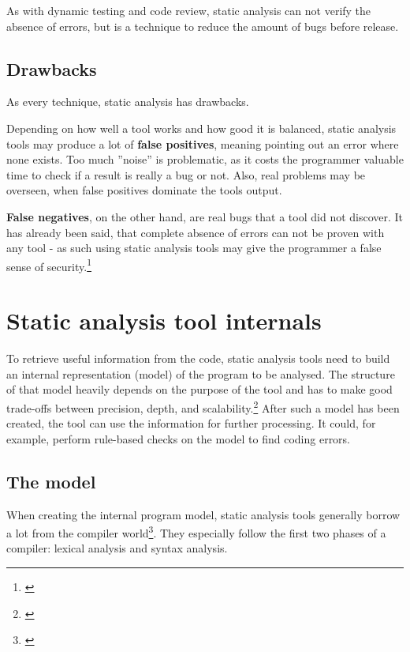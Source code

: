 As with dynamic testing and code review, static analysis can not verify the absence of errors, but is a technique to reduce the amount of bugs before release.

\subsection{Drawbacks}

As every technique, static analysis has drawbacks. 

Depending on how well a tool works and how good it is balanced, static analysis tools may produce a lot of \textbf{false positives}, meaning pointing out an error where none exists. Too much ''noise'' is problematic, as it costs the programmer valuable time to check if a result is really a bug or not. Also, real problems may be overseen, when false positives dominate the tools output.

\textbf{False negatives}, on the other hand, are real bugs that a tool did not discover. It has already been said, that complete absence of errors can not be proven with any tool - as such using static analysis tools may give the programmer a false sense of security.\footnote{\citep[23]{SecureProgramming}}


\section{Static analysis tool internals}

To retrieve useful information from the code, static analysis tools need to build an internal representation (model) of the program to be analysed. The structure of that model heavily depends on the purpose of the tool and has to make good trade-offs between precision, depth, and scalability.\footnote{\citep[45]{SecureProgramming}} After such a model has been created, the tool can use the information for further processing. It could, for example, perform rule-based checks on the model to find coding errors.

\subsection{The model}

When creating the internal program model, static analysis tools generally borrow a lot from the compiler world\footnote{\citep[72]{SecureProgramming}}. They especially follow the first two phases of a compiler: lexical analysis and syntax analysis.


